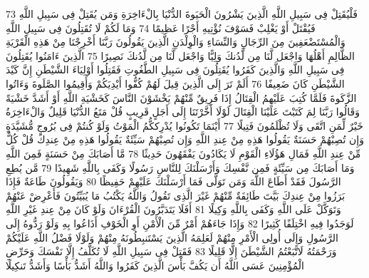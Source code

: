 {\tiny\colorbox{cl_aya}{73}} فَلْيُقَتِلْ فِى سَبِيلِ اللَّهِ الَّذِينَ يَشْرُونَ الْحَيَوةَ الدُّنْيَا بِالْءَاخِرَةِ وَمَن يُقَتِلْ فِى سَبِيلِ اللَّهِ فَيُقْتَلْ أَوْ يَغْلِبْ فَسَوْفَ نُؤْتِيهِ أَجْرًا عَظِيمًا
{\tiny\colorbox{cl_aya}{74}} وَمَا لَكُمْ لَا تُقَتِلُونَ فِى سَبِيلِ اللَّهِ وَالْمُسْتَضْعَفِينَ مِنَ الرِّجَالِ وَالنِّسَاءِ وَالْوِلْدَنِ الَّذِينَ يَقُولُونَ رَبَّنَا أَخْرِجْنَا مِنْ هَذِهِ الْقَرْيَةِ الظَّالِمِ أَهْلُهَا وَاجْعَل لَّنَا مِن لَّدُنكَ وَلِيًّا وَاجْعَل لَّنَا مِن لَّدُنكَ نَصِيرًا
{\tiny\colorbox{cl_aya}{75}} الَّذِينَ ءَامَنُوا يُقَتِلُونَ فِى سَبِيلِ اللَّهِ وَالَّذِينَ كَفَرُوا يُقَتِلُونَ فِى سَبِيلِ الطَّغُوتِ فَقَتِلُوا أَوْلِيَاءَ الشَّيْطَنِ إِنَّ كَيْدَ الشَّيْطَنِ كَانَ ضَعِيفًا
{\tiny\colorbox{cl_aya}{76}} أَلَمْ تَرَ إِلَى الَّذِينَ قِيلَ لَهُمْ كُفُّوا أَيْدِيَكُمْ وَأَقِيمُوا الصَّلَوةَ وَءَاتُوا الزَّكَوةَ فَلَمَّا كُتِبَ عَلَيْهِمُ الْقِتَالُ إِذَا فَرِيقٌ مِّنْهُمْ يَخْشَوْنَ النَّاسَ كَخَشْيَةِ اللَّهِ أَوْ أَشَدَّ خَشْيَةً وَقَالُوا رَبَّنَا لِمَ كَتَبْتَ عَلَيْنَا الْقِتَالَ لَوْلَا أَخَّرْتَنَا إِلَى أَجَلٍ قَرِيبٍ قُلْ مَتَعُ الدُّنْيَا قَلِيلٌ وَالْءَاخِرَةُ خَيْرٌ لِّمَنِ اتَّقَى وَلَا تُظْلَمُونَ فَتِيلًا
{\tiny\colorbox{cl_aya}{77}} أَيْنَمَا تَكُونُوا يُدْرِككُّمُ الْمَوْتُ وَلَوْ كُنتُمْ فِى بُرُوجٍ مُّشَيَّدَةٍ وَإِن تُصِبْهُمْ حَسَنَةٌ يَقُولُوا هَذِهِ مِنْ عِندِ اللَّهِ وَإِن تُصِبْهُمْ سَيِّئَةٌ يَقُولُوا هَذِهِ مِنْ عِندِكَ قُلْ كُلٌّ مِّنْ عِندِ اللَّهِ فَمَالِ هَؤُلَاءِ الْقَوْمِ لَا يَكَادُونَ يَفْقَهُونَ حَدِيثًا
{\tiny\colorbox{cl_aya}{78}} مَّا أَصَابَكَ مِنْ حَسَنَةٍ فَمِنَ اللَّهِ وَمَا أَصَابَكَ مِن سَيِّئَةٍ فَمِن نَّفْسِكَ وَأَرْسَلْنَكَ لِلنَّاسِ رَسُولًا وَكَفَى بِاللَّهِ شَهِيدًا
{\tiny\colorbox{cl_aya}{79}} مَّن يُطِعِ الرَّسُولَ فَقَدْ أَطَاعَ اللَّهَ وَمَن تَوَلَّى فَمَا أَرْسَلْنَكَ عَلَيْهِمْ حَفِيظًا
{\tiny\colorbox{cl_aya}{80}} وَيَقُولُونَ طَاعَةٌ فَإِذَا بَرَزُوا مِنْ عِندِكَ بَيَّتَ طَائِفَةٌ مِّنْهُمْ غَيْرَ الَّذِى تَقُولُ وَاللَّهُ يَكْتُبُ مَا يُبَيِّتُونَ فَأَعْرِضْ عَنْهُمْ وَتَوَكَّلْ عَلَى اللَّهِ وَكَفَى بِاللَّهِ وَكِيلًا
{\tiny\colorbox{cl_aya}{81}} أَفَلَا يَتَدَبَّرُونَ الْقُرْءَانَ وَلَوْ كَانَ مِنْ عِندِ غَيْرِ اللَّهِ لَوَجَدُوا فِيهِ اخْتِلَفًا كَثِيرًا
{\tiny\colorbox{cl_aya}{82}} وَإِذَا جَاءَهُمْ أَمْرٌ مِّنَ الْأَمْنِ أَوِ الْخَوْفِ أَذَاعُوا بِهِ وَلَوْ رَدُّوهُ إِلَى الرَّسُولِ وَإِلَى أُولِى الْأَمْرِ مِنْهُمْ لَعَلِمَهُ الَّذِينَ يَسْتَنبِطُونَهُ مِنْهُمْ وَلَوْلَا فَضْلُ اللَّهِ عَلَيْكُمْ وَرَحْمَتُهُ لَاتَّبَعْتُمُ الشَّيْطَنَ إِلَّا قَلِيلًا
{\tiny\colorbox{cl_aya}{83}} فَقَتِلْ فِى سَبِيلِ اللَّهِ لَا تُكَلَّفُ إِلَّا نَفْسَكَ وَحَرِّضِ الْمُؤْمِنِينَ عَسَى اللَّهُ أَن يَكُفَّ بَأْسَ الَّذِينَ كَفَرُوا وَاللَّهُ أَشَدُّ بَأْسًا وَأَشَدُّ تَنكِيلًا
